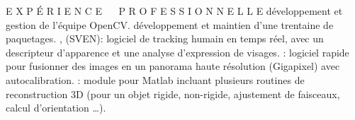 \begin{rubric}{E X P \'{E} R I E N C E ~~ P R O F E S S I O N N E L L E}
\entry*[OpenCV]
d\'{e}veloppement et gestion de l'\'{e}quipe OpenCV.
\entry*[ROS]
d\'{e}veloppement et maintien d'une trentaine de paquetages.
, (SVEN): logiciel de tracking humain en temps r\'{e}el, avec 
un descripteur d'apparence et une analyse d'expression de visages.
: logiciel rapide pour fusionner des images en un panorama haute r\'{e}solution (Gigapixel) avec 
autocalibration.
: module pour Matlab incluant plusieurs routines de reconstruction 3D (pour un objet rigide, non-rigide, ajustement de faisceaux, calcul d'orientation \ldots).
\end{rubric}


